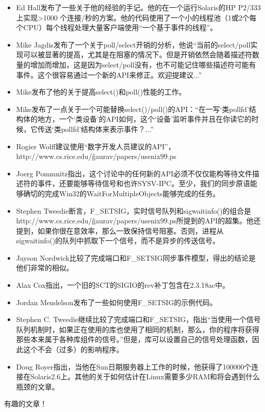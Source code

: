 \documentclass[12pt, twoside, a4paper, xetex]{report}
\begin{document}
	\begin{itemize}
		\item Ed Hall发布了一些关于他的经验的手记。他的在一个运行Solaris的HP P2/333上实现>1000 个连接/秒的方案。他的代码使用了一个小的线程池（1或2个每个CPU）每个线程处理大量客户端使用“一个基于事件的线程”。
		\item Mike Jagdis发布了一个关于poll/select开销的分析，他说“当前的select/poll实现可以被显著的提高，尤其是在阻塞的情况下。但是开销依然会随着描述符数量的增加而增加，这是因为select/poll没有，也不可能记住哪些描述符可能有事件。这个很容易通过一个新的API来修正。欢迎提建议...”
		\item Mike发布了他的关于提高select()和poll()性能的工作。
		\item Mike发布了一点关于一个可能替换select()/poll()的API：“在一写‘类pollfd’结构体的地方，一个‘类设备’的API如何，这个‘设备’监听事件并且在你读它的时候，它传送‘类pollfd’结构体来表示事件？...”
		\item Rogier Wolff建议使用“数字开发人员建议的API”，http://www.cs.rice.edu/\~gaurav/papers/usenix99.ps
		\item Joerg Pommnitz指出，这个讨论中的任何新的API必须不仅仅能构等待文件描述符的事件，还要能够等待信号和也许SYSV-IPC。至少，我们的同步原语能够确切的完成Win32的WaitForMultipleObjects能够完成的任务。
		\item Stephen Tweedie断言，F\_SETSIG，实时信号队列和sigwaitinfo()的组合是http://www.cs.rice.edu/\~gaurav/papers/usenix99.ps所提到的API的超集。他还提到，如果你很在意效率，那么一致保持信号阻塞。否则，进程从sigwaitinfo()的队列中抓取下一个信号，而不是异步的传送信号。
		\item Jayson Nordwick比较了完成端口和F\_SETSIG同步事件模型，得出的结论是他们非常的相似。
		\item Alax Cox指出，一个旧的SCT的SIGIO的rev补丁包含在2.3.18ac中。
		\item Jordan Mendelson发布了一些如何使用F\_SETSIG的示例代码。
		\item Stephen C. Tweedie继续比较了完成端口和F\_SETSIG，指出“当使用一个信号队列机制时，如果正在使用的库也使用了相同的机制，那么，你的程序将获得那些本来属于各种库组件的信号。”但是，库可以设置自己的信号处理函数，因此这个不会（过多）的影响程序。
		\item Doug Royer指出，当他在Sun日期服务器上工作的时候，他获得了100000个连接在Solaris2.6上。其他的关于如何估计在Linux需要多少RAM和将会遇到什么瓶颈的文章。
	\end{itemize}
	
	有趣的文章！
\end{document}
